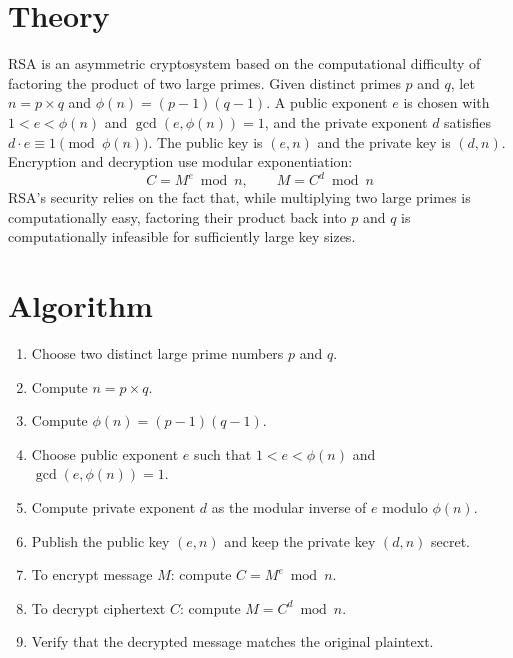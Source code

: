\section{Theory}
RSA is an asymmetric cryptosystem based on the computational difficulty of
factoring the product of two large primes. Given distinct primes $p$ and $q$,
let $n = p \times q$ and $\phi(n) = (p-1)(q-1)$. A public exponent $e$ is
chosen with $1 < e < \phi(n)$ and $\gcd(e, \phi(n)) = 1$, and the private
exponent $d$ satisfies $d \cdot e \equiv 1 \pmod{\phi(n)}$. The public key
is $(e, n)$ and the private key is $(d, n)$. Encryption and decryption use
modular exponentiation:
\[
C = M^e \bmod n, \qquad M = C^d \bmod n
\]
RSA's security relies on the fact that, while multiplying two large primes
is computationally easy, factoring their product back into $p$ and $q$ is
computationally infeasible for sufficiently large key sizes.

\section{Algorithm}
\begin{enumerate}
  \item Choose two distinct large prime numbers $p$ and $q$.
  \item Compute $n = p \times q$.
  \item Compute $\phi(n) = (p-1)(q-1)$.
  \item Choose public exponent $e$ such that $1 < e < \phi(n)$ and $\gcd(e, \phi(n)) = 1$.
  \item Compute private exponent $d$ as the modular inverse of $e$ modulo $\phi(n)$.
  \item Publish the public key $(e, n)$ and keep the private key $(d, n)$ secret.
  \item To encrypt message $M$: compute $C = M^e \bmod n$.
  \item To decrypt ciphertext $C$: compute $M = C^d \bmod n$.
  \item Verify that the decrypted message matches the original plaintext.
\end{enumerate}

